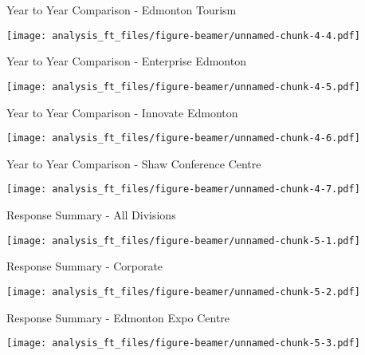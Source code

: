 \documentclass[handout]{beamer}
\begin{document}
\begin{frame}{Year to Year Comparison - Edmonton Tourism}
\protect\hypertarget{year-to-year-comparison---edmonton-tourism}{}

\texttt{[image: analysis\_ft\_files/figure-beamer/unnamed-chunk-4-4.pdf]}

\end{frame}

\begin{frame}{Year to Year Comparison - Enterprise Edmonton}
\protect\hypertarget{year-to-year-comparison---enterprise-edmonton}{}

\texttt{[image: analysis\_ft\_files/figure-beamer/unnamed-chunk-4-5.pdf]}

\end{frame}

\begin{frame}{Year to Year Comparison - Innovate Edmonton}
\protect\hypertarget{year-to-year-comparison---innovate-edmonton}{}

\texttt{[image: analysis\_ft\_files/figure-beamer/unnamed-chunk-4-6.pdf]}

\end{frame}

\begin{frame}{Year to Year Comparison - Shaw Conference Centre}
\protect\hypertarget{year-to-year-comparison---shaw-conference-centre}{}

\texttt{[image: analysis\_ft\_files/figure-beamer/unnamed-chunk-4-7.pdf]}

\end{frame}

\begin{frame}{Response Summary - All Divisions}
\protect\hypertarget{response-summary---all-divisions}{}

\texttt{[image: analysis\_ft\_files/figure-beamer/unnamed-chunk-5-1.pdf]}

\end{frame}

\begin{frame}{Response Summary - Corporate}
\protect\hypertarget{response-summary---corporate}{}

\texttt{[image: analysis\_ft\_files/figure-beamer/unnamed-chunk-5-2.pdf]}

\end{frame}

\begin{frame}{Response Summary - Edmonton Expo Centre}
\protect\hypertarget{response-summary---edmonton-expo-centre}{}

\texttt{[image: analysis\_ft\_files/figure-beamer/unnamed-chunk-5-3.pdf]}

\end{frame}
\end{document}
